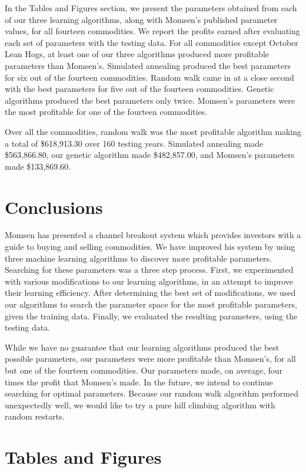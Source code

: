 \documentclass[12pt]{article}
\begin{document}
In the Tables and Figures section, we present the parameters obtained from each
of our three learning algorithms, along with Momsen's published parameter
values, for all fourteen commodities. We report the profits earned after
evaluating each set of parameters with the testing data.  For all commodities
except October Lean Hogs, at least one of our three algorithms produced more
profitable parameters than Momsen's. Simulated annealing produced the best
parameters for six out of the fourteen commodities.  Random walk came in at a
close second with the best parameters for five out of the fourteen commodities.
Genetic algorithms produced the best parameters only twice.  Momsen's parameters
were the most profitable for one of the fourteen commodities.

Over all the commodities, random walk was the most profitable algorithm making a
total of \$618,913.30 over 160 testing years.  Simulated annealing made
\$563,866.80, our genetic algorithm made \$482,857.00, and Momsen's parameters
made \$133,869.60.

\section{Conclusions}

Momsen has presented a channel breakout system which provides investors with a
guide to buying and selling commodities.  We have improved his system by using
three machine learning algorithms to discover more profitable
parameters. Searching for these parameters was a three step process. First, we
experimented with various modifications to our learning algorithms, in an
attempt to improve their learning efficiency. After determining the best set of
modifications, we used our algorithms to search the parameter space for the most
profitable parameters, given the training data. Finally, we evaluated the
resulting parameters, using the testing data.

While we have no guarantee that our learning algorithms produced the best
possible parameters, our parameters were more profitable than Momsen's, for all
but one of the fourteen commodities.  Our parameters made, on average, four
times the profit that Momsen's made.  In the future, we intend to continue
searching for optimal parameters.  Because our random walk algorithm performed
unexpectedly well, we would like to try a pure hill climbing algorithm with
random restarts.

\pagebreak
\section{Tables and Figures}
\end{document}

